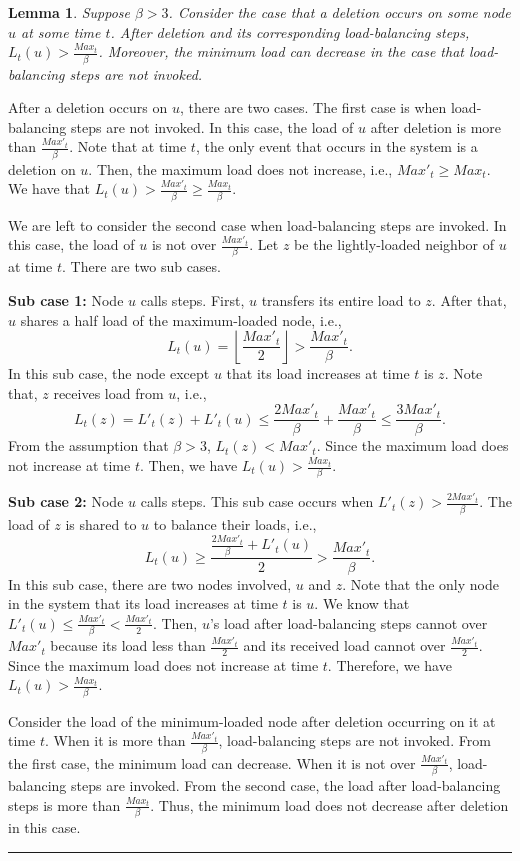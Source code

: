 \documentclass[a4paper]{article}
\newtheorem{lemma}{Lemma}
\newenvironment{proof}{{\bf Proof:}}{\hfill\rule{1.5mm}{3mm}\vspace{0.1in}}
\begin{document}
\begin{lemma}\label{lem:delete-property}
  Suppose $\beta>3$. Consider the case that a deletion occurs on
  some node $u$ at some time $t$.  After deletion and its corresponding
  load-balancing steps, $L_t(u)>\frac{Max_t}{\beta}$. Moreover, the minimum
  load can decrease in the case that  load-balancing steps are not
  invoked.
\end{lemma}

\begin{proof}
  After a deletion occurs on $u$, there are two cases.  The first case is when 
  load-balancing steps are not invoked. In this case, the load of
  $u$ after deletion is more than $\frac{Max'_t}{\beta}$.  Note that at time
  $t$, the only event that occurs in the system is a deletion on $u$.
  Then, the maximum load does not increase, i.e., $Max'_t\geq
  Max_t$. We have that $L_t(u)>\frac{Max'_t}{\beta}\geq \frac{Max_t}{\beta}$.
  
  We are left to consider the second case when  load-balancing
  steps are invoked.  In this case, the load of $u$ is not over
  $\frac{Max'_t}{\beta}$. Let $z$ be the lightly-loaded neighbor of
  $u$ at time $t$. There are two sub cases.

  \textbf{Sub case 1:} Node $u$ calls {\splitmax} steps.  First, 
  $u$ transfers its entire load to $z$.  After that, $u$ shares a half 
  load of the maximum-loaded node, i.e., 
  \[ L_t(u)= \left\lfloor \frac{Max'_t}{2}\right\rfloor > \frac{Max'_t}{\beta}.\]
  In this sub case, the node except $u$
     that its load increases at time $t$ is $z$. Note
  that, $z$ receives load from $u$, i.e., 
  \[ L_t(z)= L'_t(z)+L'_t(u)\leq \frac{2Max'_t}{\beta}+\frac{Max'_t}{\beta}\leq \frac{3Max'_t}{\beta}.\]
    From the assumption that $\beta>3$,  $L_t(z)< Max'_t$. Since the maximum load does not increase
  at time $t$.  Then, we have $L_t(u)> \frac{Max_t}{\beta}$.

  \textbf{Sub case 2:} Node $u$ calls {\splitnbr} steps. This sub case
  occurs when $L'_t(z)>\frac{2Max'_t}{\beta}$. The load of $z$ is shared to
  $u$ to balance their loads, i.e., 
  \[ L_t(u)\geq \frac{\frac{2Max'_t}{\beta}+L'_t(u)}{2}> \frac{Max'_t}{\beta}.\]
  In this sub case, there are two nodes involved, $u$ and $z$.  Note that the only node in
  the system that its load increases at time $t$ is $u$.  We know that
  $L'_t(u)\leq\frac{Max'_t}{\beta}<\frac{Max'_t}{2}$. Then, $u$'s load
  after  load-balancing steps cannot over $Max'_t$ because its load
  less than $\frac{Max'_t}{2}$ and its received load cannot over
  $\frac{Max'_t}{2}$.  Since the maximum load does not increase
  at time $t$.  Therefore, we have $L_t(u)> \frac{Max_t}{\beta}$.
  
  Consider the load of the minimum-loaded node after deletion occurring on it at time
  $t$. When it is more than $\frac{Max'_t}{\beta}$,  load-balancing steps
  are not invoked. From the first case, the minimum load can decrease.
  When it is not over $\frac{Max'_t}{\beta}$,  load-balancing steps
  are invoked. From the second case, the load after load-balancing
  steps is more than $\frac{Max_t}{\beta}$. Thus, the minimum load does not
  decrease after deletion in this case.
\end{proof}
\end{document}
